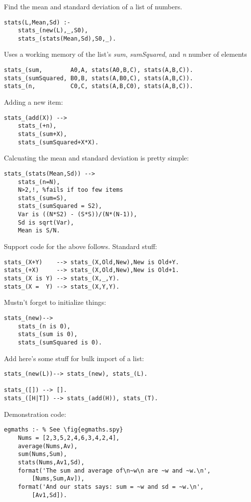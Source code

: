 \subsubsection{ 
}
Find the mean and standard deviation of a list
of numbers.
\begin{Verbatim}
stats(L,Mean,Sd) :-
	stats_(new(L),_,S0),
	stats_(stats(Mean,Sd),S0,_).
\end{Verbatim}
Uses a working memory of the list's {\em sum},
{\em sumSquared}, and {\em n} number of elements
\begin{Verbatim}
stats_(sum,        A0,A, stats(A0,B,C), stats(A,B,C)).
stats_(sumSquared, B0,B, stats(A,B0,C), stats(A,B,C)).
stats_(n,          C0,C, stats(A,B,C0), stats(A,B,C)).
\end{Verbatim}
Adding a new item:
\begin{Verbatim}
stats_(add(X)) -->
	stats_(+n),
	stats_(sum+X),
	stats_(sumSquared+X*X).
\end{Verbatim}
Calcuating the mean and standard
deviation is pretty simple:
\begin{Verbatim}
stats_(stats(Mean,Sd)) -->
	stats_(n=N),
	N>2,!, %fails if too few items
	stats_(sum=S),
	stats_(sumSquared = S2),
	Var is ((N*S2) - (S*S))/(N*(N-1)),
	Sd is sqrt(Var),
	Mean is S/N.
\end{Verbatim}
Support code for the above follows. Standard stuff:
\begin{Verbatim}
stats_(X+Y)    --> stats_(X,Old,New),New is Old+Y.
stats_(+X)     --> stats_(X,Old,New),New is Old+1.
stats_(X is Y) --> stats_(X,_,Y).
stats_(X =  Y) --> stats_(X,Y,Y).
\end{Verbatim}
Mustn't forget to initialize things:
\begin{Verbatim}
stats_(new)-->
	stats_(n is 0),
	stats_(sum is 0),
	stats_(sumSquared is 0).
\end{Verbatim}
Add here's some stuff for bulk import of a list:
\begin{Verbatim}
stats_(new(L))--> stats_(new), stats_(L).

stats_([]) --> [].
stats_([H|T]) --> stats_(add(H)), stats_(T).
\end{Verbatim}
Demonstration code:
\begin{Verbatim}
egmaths :- % See \fig{egmaths.spy}
    Nums = [2,3,5,2,4,6,3,4,2,4],
    average(Nums,Av),
    sum(Nums,Sum),
    stats(Nums,Av1,Sd),
    format('The sum and average of\n~w\n are ~w and ~w.\n',
        [Nums,Sum,Av]),
    format('And our stats says: sum = ~w and sd = ~w.\n',
        [Av1,Sd]).
\end{Verbatim}
